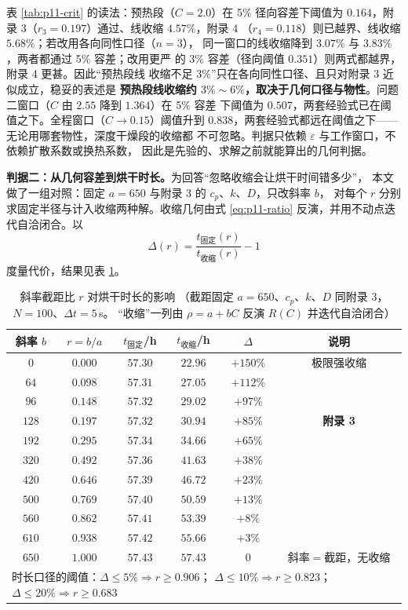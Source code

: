 \documentclass[12pt,a4paper,fontset=none]{ctexart}
\begin{document}
表 \ref{tab:p11-crit} 的读法：预热段（$C=2.0$）在 5\% 径向容差下阈值为
$0.164$，附录 3（$r_3=0.197$）通过、线收缩 $4.57\%$，附录 4
（$r_4=0.118$）则已越界、线收缩 $5.68\%$；若改用各向同性口径（$n=3$），
同一窗口的线收缩降到 $3.07\%$ 与 $3.83\%$，两者都通过 5\% 容差；改用更严
的 3\% 容差（径向阈值 $0.351$）则两式都越界，附录 4 更甚。因此“预热段线
收缩不足 $3\%$”只在各向同性口径、且只对附录 3 近似成立，稳妥的表述是
\textbf{预热段线收缩约 $3\%\sim6\%$，取决于几何口径与物性}。问题二窗口（$C$ 由 $2.55$ 降到 $1.364$）在 5\% 容差
下阈值为 $0.507$，两套经验式已在阈值之下。全程窗口（$C\to0.15$）阈值升到
$0.838$，两套经验式都远在阈值之下——无论用哪套物性，深度干燥段的收缩都
不可忽略。判据只依赖 $\varepsilon$ 与工作窗口，不依赖扩散系数或换热系数，
因此是先验的、求解之前就能算出的几何判据。

\textbf{判据二：从几何容差到烘干时长。}为回答“忽略收缩会让烘干时间错多少”，
本文做了一组对照：固定 $a=650$ 与附录 3 的 $c_p$、$k$、$D$，只改斜率 $b$，
对每个 $r$ 分别求固定半径与计入收缩两种解。收缩几何由式
\eqref{eq:p11-ratio} 反演，并用不动点迭代自洽闭合。以
\begin{equation}
  \Delta(r)=\frac{t_{\text{固定}}(r)}{t_{\text{收缩}}(r)}-1
  \label{eq:p11-delta}
\end{equation}
度量代价，结果见表 \ref{tab:p11-sweep}。

\begin{table}[htbp]
  \centering
  \caption{斜率截距比 $r$ 对烘干时长的影响
    （截距固定 $a=650$、$c_p$、$k$、$D$ 同附录 3，$N=100$、$\Delta t=5$\,s。
    “收缩”一列由 $\rho=a+bC$ 反演 $R(C)$ 并迭代自洽闭合）}
  \label{tab:p11-sweep}
  \small
  \begin{tabular}{cccccc}
    \toprule
    斜率 $b$ & $r=b/a$ & $t_{\text{固定}}$/h & $t_{\text{收缩}}$/h
      & $\Delta$ & 说明 \\
    \midrule
    $0$   & $0.000$ & $57.30$ & $22.96$ & $+150\%$ & 极限强收缩 \\
    $64$  & $0.098$ & $57.31$ & $27.05$ & $+112\%$ & \\
    $96$  & $0.148$ & $57.32$ & $29.02$ & $+97\%$  & \\
    $128$ & $0.197$ & $57.32$ & $30.94$ & $+85\%$  & \textbf{附录 3} \\
    $192$ & $0.295$ & $57.34$ & $34.66$ & $+65\%$  & \\
    $320$ & $0.492$ & $57.36$ & $41.63$ & $+38\%$  & \\
    $420$ & $0.646$ & $57.39$ & $46.72$ & $+23\%$  & \\
    $500$ & $0.769$ & $57.40$ & $50.59$ & $+13\%$  & \\
    $560$ & $0.862$ & $57.41$ & $53.39$ & $+8\%$   & \\
    $610$ & $0.938$ & $57.42$ & $55.66$ & $+3\%$   & \\
    $650$ & $1.000$ & $57.43$ & $57.43$ & $0$      & 斜率$=$截距，无收缩 \\
    \midrule
    \multicolumn{6}{l}{时长口径的阈值：$\Delta\le5\%\Rightarrow r\ge0.906$；
      $\Delta\le10\%\Rightarrow r\ge0.823$；$\Delta\le20\%\Rightarrow r\ge0.683$} \\
    \bottomrule
  \end{tabular}
\end{table}
\end{document}
